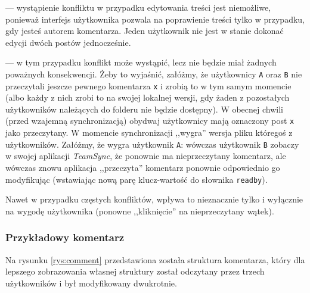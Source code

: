 \begin{description}[noitemsep]
  \item[Modyfikacja treści] --- wystąpienie konfliktu w przypadku edytowania treści jest niemożliwe, ponieważ interfejs użytkownika pozwala na poprawienie treści tylko w przypadku, gdy jesteś autorem komentarza. Jeden użytkownik nie jest w stanie dokonać edycji dwóch postów jednocześnie.
  
  \item[Odznaczenie jako przeczytane] --- w tym przypadku konflikt może wystąpić, lecz nie będzie miał żadnych poważnych konsekwencji. Żeby to wyjaśnić, załóżmy, że użytkownicy \texttt{A} oraz \texttt{B} nie przeczytali jeszcze pewnego komentarza \texttt{x} i zrobią to w tym samym momencie (albo każdy z nich zrobi to na swojej lokalnej wersji, gdy żaden z pozostałych użytkowników należących do folderu nie będzie dostępny). W obecnej chwili (przed wzajemną synchronizacją) obydwaj użytkownicy mają oznaczony post \texttt{x} jako przeczytany. W momencie synchronizacji ,,wygra'' wersja pliku któregoś z użytkowników. Załóżmy, że wygra użytkownik \texttt{A}: wówczas użytkownik \texttt{B} zobaczy w swojej aplikacji \emph{TeamSync}, że ponownie ma nieprzeczytany komentarz, ale wówczas znowu aplikacja ,,przeczyta'' komentarz ponownie odpowiednio go modyfikując (wstawiając nową parę klucz-wartość do słownika \texttt{readby}).
  
  Nawet w przypadku częstych konfliktów, wpływa to nieznacznie tylko i wyłącznie na wygodę użytkownika (ponowne ,,kliknięcie'' na nieprzeczytany wątek).
\end{description}

\subsubsection*{Przykładowy komentarz}

Na rysunku \ref{rys:comment} przedstawiona została struktura komentarza, który dla lepszego zobrazowania własnej struktury został odczytany przez trzech użytkowników i był modyfikowany dwukrotnie.

